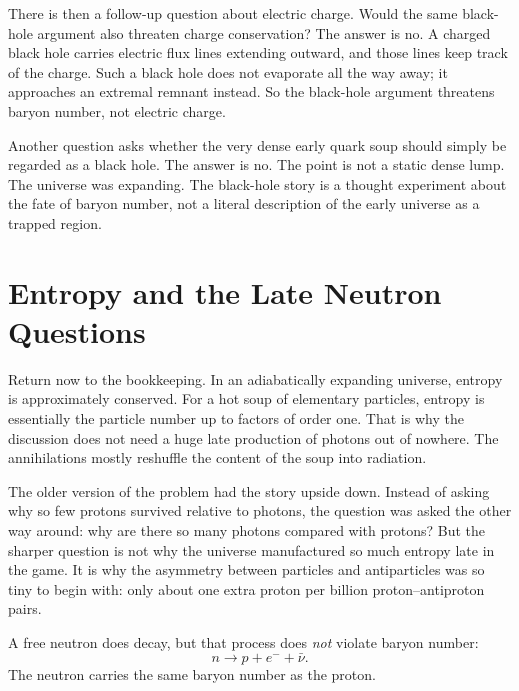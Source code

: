 There is then a follow-up question about electric charge. Would the same black-hole argument also threaten charge conservation? The answer is no. A charged black hole carries electric flux lines extending outward, and those lines keep track of the charge. Such a black hole does not evaporate all the way away; it approaches an extremal remnant instead. So the black-hole argument threatens baryon number, not electric charge.

Another question asks whether the very dense early quark soup should simply be regarded as a black hole. The answer is no. The point is not a static dense lump. The universe was expanding. The black-hole story is a thought experiment about the fate of baryon number, not a literal description of the early universe as a trapped region.

\begin{classroomqa}
\end{classroomqa}

\section{Entropy and the Late Neutron Questions}

Return now to the bookkeeping. In an adiabatically expanding universe, entropy is approximately conserved. For a hot soup of elementary particles, entropy is essentially the particle number up to factors of order one. That is why the discussion does not need a huge late production of photons out of nowhere. The annihilations mostly reshuffle the content of the soup into radiation.

The older version of the problem had the story upside down. Instead of asking why so few protons survived relative to photons, the question was asked the other way around: why are there so many photons compared with protons? But the sharper question is not why the universe manufactured so much entropy late in the game. It is why the asymmetry between particles and antiparticles was so tiny to begin with: only about one extra proton per billion proton--antiproton pairs.

A free neutron does decay, but that process does \emph{not} violate baryon number:
\[
n \to p + e^- + \bar\nu.
\]
The neutron carries the same baryon number as the proton.

